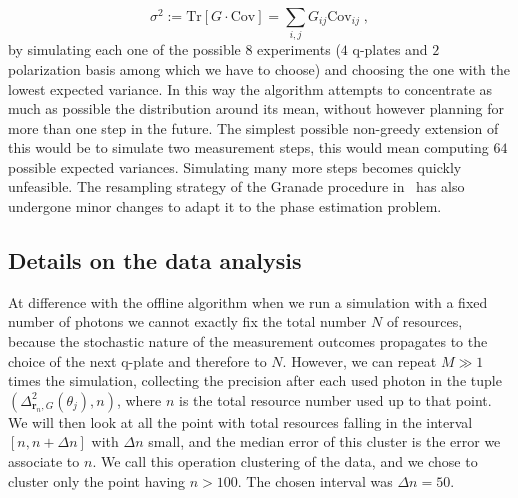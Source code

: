 \documentclass[superscriptaddress,notitlepage,pra]{revtex4-1}
\begin{document}
%
\begin{equation}
	\sigma^2 := \text{Tr} \left[ G \cdot \text{Cov} \right] = \sum_{i, j} G_{ij} \text{Cov}_{ij} \; ,
\end{equation}
%
by simulating each one of the possible $8$ experiments ($4$ q-plates and $2$ polarization basis among which we have to choose) and choosing the one with the lowest expected variance. In this way the algorithm attempts to concentrate as much as possible the distribution around its mean, without however planning for more than one step in the future. The simplest possible non-greedy extension of this would be to simulate two measurement steps, this would mean computing $64$ possible expected variances. Simulating many more steps becomes quickly unfeasible. The resampling strategy of the Granade procedure in~\cite{granade2012robust} has also undergone minor changes to adapt it to the phase estimation problem. 

\subsection*{Details on the data analysis}
\label{sec:details}
%
At difference with the offline algorithm when we run a simulation with a fixed number of photons we cannot exactly fix the total number $N$ of resources, because the stochastic nature of the measurement outcomes propagates to the choice of the next q-plate and therefore to $N$. However, we can repeat $M \gg 1$ times the simulation, collecting the precision after each used photon in the tuple $(\Delta_{{\boldsymbol{r}_n}, G}^2 (\theta_j), n)$, where $n$ is the total resource number used up to that point. We will then look at all the point with total resources falling in the interval $[n, n+\Delta n]$ with $\Delta n$ small, and the median error of this cluster is the error we associate to $n$. We call this operation clustering of the data, and we chose to cluster only the point having $n>100$. The chosen interval was $\Delta n = 50$. 
\end{document}
